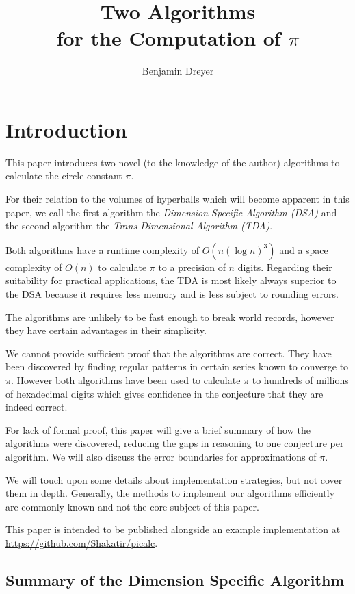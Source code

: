 \documentclass[a4paper,11pt]{scrartcl}
\author{Benjamin Dreyer}
\title{Two Algorithms \\ for the Computation of $\pi$}
\theoremstyle{definition}
\theoremstyle{plain}
\theoremstyle{remark}
\begin{document}
\maketitle

\tableofcontents

\section{Introduction}

This paper introduces two novel (to the knowledge of the author) algorithms to calculate the circle constant $\pi$.

For their relation to the volumes of hyperballs which will become apparent in this paper, we call the first algorithm the \emph{Dimension Specific Algorithm (DSA)} and the second algorithm the \emph{Trans-Dimensional Algorithm (TDA)}.

Both algorithms have a runtime complexity of $O(n (\log n)^3)$ and a space complexity of $O(n)$ to calculate $\pi$ to a precision of $n$ digits.
Regarding their suitability for practical applications, the TDA is most likely always superior to the DSA because it requires less memory and is less subject to rounding errors.

The algorithms are unlikely to be fast enough to break world records, however they have certain advantages in their simplicity.

We cannot provide sufficient proof that the algorithms are correct.
They have been discovered by finding regular patterns in certain series known to converge to $\pi$.
However both algorithms have been used to calculate $\pi$ to hundreds of millions of hexadecimal digits which gives confidence in the conjecture that they are indeed correct.

For lack of formal proof, this paper will give a brief summary of how the algorithms were discovered, reducing the gaps in reasoning to one conjecture per algorithm.
We will also discuss the error boundaries for approximations of $\pi$.

We will touch upon some details about implementation strategies, but not cover them in depth.
Generally, the methods to implement our algorithms efficiently are commonly known and not the core subject of this paper.

This paper is intended to be published alongside an example implementation at \url{https://github.com/Shakatir/picalc}.

\subsection{Summary of the Dimension Specific Algorithm}
\end{document}

